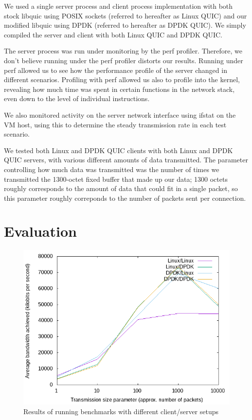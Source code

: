 \documentclass{sig-alternate-05-2015}
\begin{document}
We used a single server process and client process implementation with both 
stock libquic using POSIX sockets
(referred to hereafter as Linux QUIC)
and our modified libquic using DPDK
(referred to hereafter as DPDK QUIC).
We simply compiled the server and client with both Linux QUIC and DPDK QUIC.

The server process was run under monitoring by the perf profiler.
Therefore, we don't believe running under the perf profiler distorts our results.
Running under perf allowed us to see how the performance profile of the server changed in different scenarios.
Profiling with perf allowed us also to profile into the kernel,
revealing how much time was spent in certain functions in the network stack,
even down to the level of individual instructions.

We also monitored activity on the server network interface using ifstat on the VM host,
using this to determine the steady transmission rate in each test scenario.

We tested both Linux and DPDK QUIC clients with both Linux and DPDK QUIC servers,
with various different amounts of data transmitted.
The parameter controlling how much data was transmitted was the number of times we transmitted the 1300-octet fixed buffer that made up our data;
1300 octets roughly corresponds to the amount of data that could fit in a single packet,
so this parameter roughly correponds to the number of packets sent per connection.

\section{Evaluation}

\begin{figure}[bh]
\centering
\includegraphics[width=\textwidth]{plot.png}
\caption{Results of running benchmarks with different client/server setups}
\label{fig:benchmark}
\end{figure}
\end{document}
